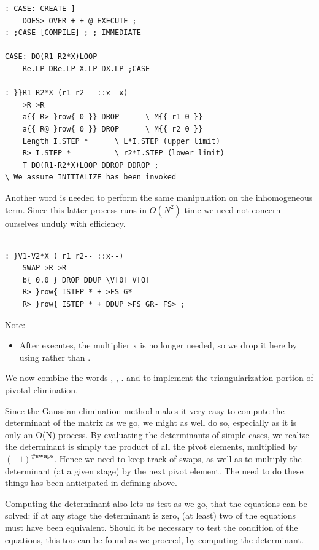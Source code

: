 \begin{verbatim}
: CASE: CREATE ]
    DOES> OVER + + @ EXECUTE ;
: ;CASE [COMPILE] ; ; IMMEDIATE

CASE: DO(R1-R2*X)LOOP
    Re.LP DRe.LP X.LP DX.LP ;CASE

: }}R1-R2*X (r1 r2-- ::x--x)
    >R >R
    a{{ R> }row{ 0 }} DROP      \ M{{ r1 0 }} 
    a{{ R@ }row{ 0 }} DROP      \ M{{ r2 0 }} 
    Length I.STEP *      \ L*I.STEP (upper limit)
    R> I.STEP *          \ r2*I.STEP (lower limit)
    T DO(R1-R2*X)LOOP DDROP DDROP ;
\ We assume INITIALIZE has been invoked
\end{verbatim} 
Another word is needed to perform the same manipulation on the inhomogeneous term. Since this latter process runs in $O(N^2)$ time we need not concern ourselves unduly with efficiency.
\begin{verbatim}

: }V1-V2*X ( r1 r2-- ::x--)
    SWAP >R >R
    b{ 0.0 } DROP DDUP \V[0] V[O]
    R> }row{ ISTEP * + >FS G*
    R> }row{ ISTEP * + DDUP >FS GR- FS> ;
\end{verbatim} 

\underline{Note:}
\begin{itemize}
    \item  After  executes, the multiplier x is no longer needed,
        so we drop it here by using  rather than .
\end{itemize}

We now combine the words , , .  and  to implement the triangularization portion of pivotal elimination.

Since the Gaussian elimination method makes it very easy to
compute the determinant of the matrix as we go, we might as well do so, especially as it is only an O(N) process. By evaluating the determinants of simple cases, we realize the determinant is simply the product of all the pivot elements, multiplied by $(-1)^{\#\mathbf{swaps}}$. Hence we need to keep track of swaps, as well as to multiply the determinant (at a given stage) by the next pivot element. The need to do these things has been anticipated in defining  above.

Computing the determinant also lets us test as we go, that the equations can be solved: if at any stage the determinant is zero, (at least) two of the equations must have been equivalent. Should it be necessary to test the condition of the equations, this too can be found as we proceed, by computing the determinant.

